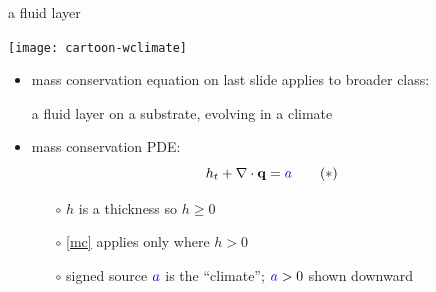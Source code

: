 \documentclass[xcolor={dvipsnames}]{beamer}
\newcommand\bq{\mathbf{q}}
\newcommand\Div{\nabla\cdot}
\begin{document}
\begin{frame}{a fluid layer}

\begin{center}
\texttt{[image: cartoon-wclimate]}
\end{center}

\vspace{-7mm}
\begin{itemize}
\item mass conservation equation on last slide applies to broader class:
  \begin{center}
  \alert{a fluid layer on a substrate, evolving in a climate}
  \end{center}
\item mass conservation PDE:
\begin{equation}
h_t + \Div\bq = {\color{blue} a}  \tag{$\ast$} \label{mc}
\end{equation}
    \begin{itemize}
    \vspace{-4mm}
    \item[$\circ$] $h$ is a thickness so $h\ge 0$
    \item[$\circ$] \eqref{mc} applies only where $h>0$
    \item[$\circ$] signed source ${\color{blue} a}$ is the ``climate''; ${\color{blue} a}>0$ shown downward
    \end{itemize}
\end{itemize}
\end{frame}
\end{document}
